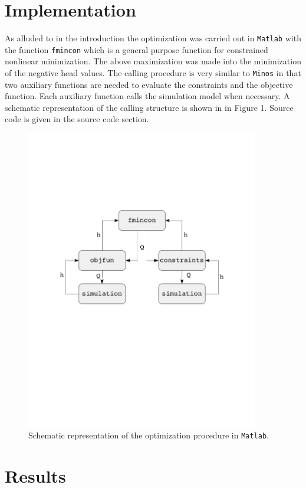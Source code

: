 \documentclass[12pt,twoside]{article}
\begin{document}
\section*{Implementation}
As alluded to in the introduction the optimization was carried out in \verb"Matlab" with the function \verb"fmincon" which is a general purpose function for constrained nonlinear minimization.  The above maximization was made into the minimization of the negative head values.  The calling procedure is very similar to \texttt{Minos} in that two auxiliary functions are needed to evaluate the constraints and the objective function.  Each auxiliary function calls the simulation model when necessary.  A schematic representation of the calling structure is shown in in Figure 1.  Source code is given in the source code section.

\begin{figure}[!h] %
   \centering
   \includegraphics[width=4in]{figs/flow.pdf} 
   \caption{Schematic representation of the optimization procedure in \texttt{Matlab}.}
   \label{fig:flow}
\end{figure}

\newpage
\section*{Results}
\end{document}

